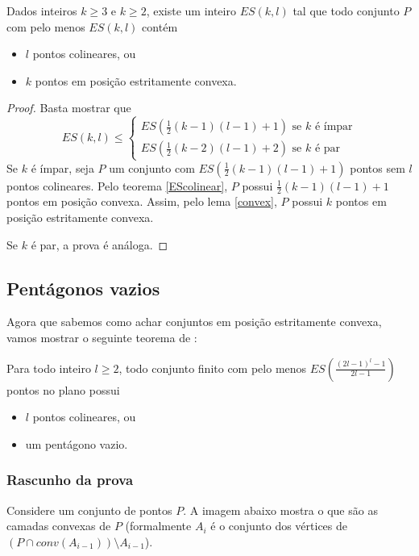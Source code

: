 \begin{teorema}
    Dados inteiros $k\geq 3$ e $k\geq 2$, existe um inteiro $ES(k,l)$ tal que todo conjunto $P$ com pelo menos $ES(k,l)$ contém 
    \begin{itemize}
        \item $l$ pontos colineares, ou
        \item $k$ pontos em posição estritamente convexa.
    \end{itemize}
\end{teorema}
\begin{proof}
    Basta mostrar que
    $$
    ES(k,l)\leq
    \begin{cases}
        ES(\frac{1}{2}(k-1)(l-1)+1) \text{ se }k\text{ é ímpar}\\
        ES(\frac{1}{2}(k-2)(l-1)+2) \text{ se }k\text{ é par}
    \end{cases}$$
    Se $k$ é ímpar, seja $P$ um conjunto com $ES(\frac{1}{2}(k-1)(l-1)+1)$ pontos sem $l$ pontos colineares. Pelo teorema \ref{EScolinear}, $P$ possui $\frac{1}{2}(k-1)(l-1)+1$ pontos em posição convexa. Assim, pelo lema \ref{convex}, $P$ possui $k$ pontos em posição estritamente convexa.

    Se $k$ é par, a prova é análoga.
\end{proof}

\subsection{Pentágonos vazios}

Agora que sabemos como achar conjuntos em posição estritamente convexa, vamos mostrar o seguinte teorema de \cite{pentagon}:

\begin{teorema}
    Para todo inteiro $l\geq 2$, todo conjunto finito com pelo menos $ES(\frac{(2l-1)^l-1}{2l-1})$ pontos no plano possui 
    \begin{itemize}
        \item $l$ pontos colineares, ou
        \item um pentágono vazio.
    \end{itemize}
\end{teorema}
\subsubsection {Rascunho da prova}
Considere um conjunto de pontos $P$. A imagem abaixo mostra o que são as camadas convexas de $P$ (formalmente $A_i$ é o conjunto dos vértices de $(P\cap conv(A_{i-1})) \setminus A_{i-1}$).

